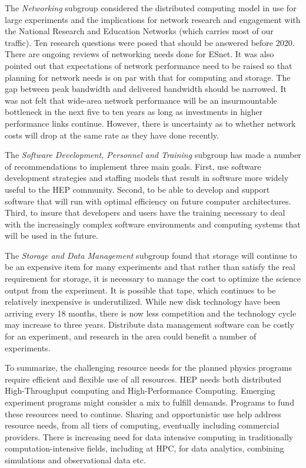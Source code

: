 The {\it Networking} subgroup considered the distributed computing model in use for large experiments and the implications for network research and engagement with the National Research and Education Networks (which carries most of our traffic). Ten research questions were posed that should be answered before 2020. There are ongoing reviews of networking needs done for ESnet. It was also pointed out that expectations of network performance need to be raised so that planning for network needs is on par with that for computing and storage.  The gap between peak bandwidth and delivered bandwidth should be narrowed.  It was not felt that wide-area network performance will be an insurmountable bottleneck in the next five to ten years as long as investments in higher performance links continue.  However, there is uncertainty as to whether network costs will drop at the same rate as they have done recently.

The {\it Software Development, Personnel and Training} subgroup has made a number of recommendations to implement three main goals.  First, use software development strategies and staffing models that result in software more widely useful to the HEP community.  Second, to be able to develop and support software that will run with optimal efficiency on future computer architectures. Third, to insure that developers and users have the training necessary to deal with the increasingly complex software environments and computing systems that will be used in the future.

The {\it Storage and Data Management} subgroup found that storage will continue to be an expensive item for many experiments and that rather than satisfy the real requirement for storage, it is necessary to manage the cost to optimize the science output from the experiment.  It is possible that tape, which continues to be relatively inexpensive is underutilized.  While new disk technology have been arriving every 18 months, there is now less competition and the technology cycle may increase to three years.  Distribute data management software can be costly for an experiment, and research in the area could benefit a number of experiments.

To summarize, the challenging resource needs for the planned physics programs require efficient and flexible use of all resources. HEP needs both distributed High-Throughput computing and High-Performance Computing. Emerging experiment programs might consider a mix to fulfill demands. Programs to fund these resources need to continue. Sharing and opportunistic use help address resource needs, from all tiers of computing, eventually including commercial providers. There is increasing need for data intensive computing in traditionally computation-intensive fields, including at HPC, for data analytics, combining simulations and observational data etc. 

